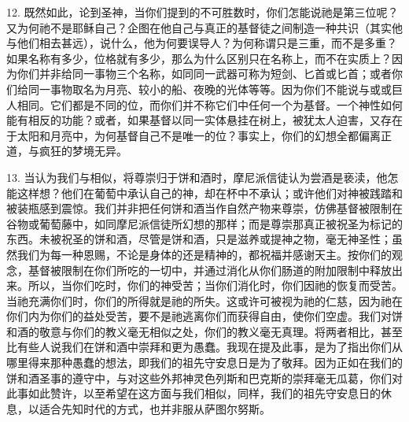 12. 既然如此，论到圣神，当你们提到的不可胜数时，你们怎能说祂是第三位呢？又为何祂不是耶稣自己？企图在他自己与真正的基督徒之间制造一种共识（其实他与他们相去甚远），说什么，他为何要误导人？为何称谓只是三重，而不是多重？如果名称有多少，位格就有多少，那么为什么区别只在名称上，而不在实质上？因为你们并非给同一事物三个名称，如同同一武器可称为短剑、匕首或匕首；或者你们给同一事物取名为月亮、较小的船、夜晚的光体等等。因为你们不能说与或或巨人相同。它们都是不同的位，而你们并不称它们中任何一个为基督。一个神性如何能有相反的功能？或者，如果基督以同一实体悬挂在树上，被犹太人迫害，又存在于太阳和月亮中，为何基督自己不是唯一的位？事实上，你们的幻想全都偏离正道，与疯狂的梦境无异。\par

13. 当认为我们与相似，将尊崇归于饼和酒时，摩尼派信徒认为尝酒是亵渎，他怎能这样想？他们在葡萄中承认自己的神，却在杯中不承认；或许他们对神被践踏和被装瓶感到震惊。我们并非把任何饼和酒当作自然产物来尊崇，仿佛基督被限制在谷物或葡萄藤中，如同摩尼派信徒所幻想的那样；而是尊崇那真正被祝圣为标记的东西。未被祝圣的饼和酒，尽管是饼和酒，只是滋养或提神之物，毫无神圣性；虽然我们为每一种恩赐，不论是身体的还是精神的，都祝福并感谢天主。按你们的观念，基督被限制在你们所吃的一切中，并通过消化从你们肠道的附加限制中释放出来。所以，当你们吃时，你们的神受苦；当你们消化时，你们因祂的恢复而受苦。当祂充满你们时，你们的所得就是祂的所失。这或许可被视为祂的仁慈，因为祂在你们内为你们的益处受苦，要不是祂逃离你们而获得自由，使你们空虚。我们对饼和酒的敬意与你们的教义毫无相似之处，你们的教义毫无真理。将两者相比，甚至比有些人说我们在饼和酒中崇拜和更为愚蠢。我现在提及此事，是为了指出你们从哪里得来那种愚蠢的想法，即我们的祖先守安息日是为了敬拜。因为正如在我们的饼和酒圣事的遵守中，与对这些外邦神灵色列斯和巴克斯的崇拜毫无瓜葛，你们对此事如此赞许，以至希望在这方面与我们相似，同样，我们的祖先守安息日的休息，以适合先知时代的方式，也并非服从萨图尔努斯。\par

